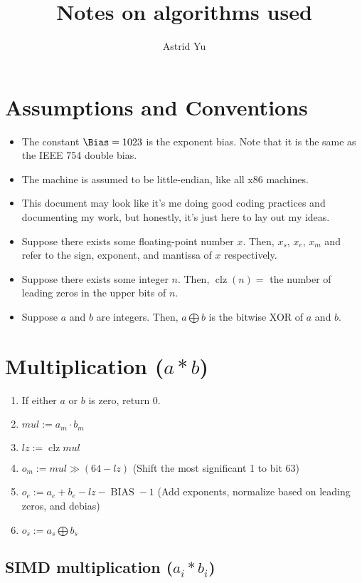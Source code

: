 \documentclass[12pt]{article}
\title{Notes on algorithms used}
\author{Astrid Yu}
\DeclareMathOperator{\bias}{BIAS}
\DeclareMathOperator{\clz}{clz}
\begin{document}
    \maketitle
    \section{Assumptions and Conventions}\label{sec:assumptions}

    \begin{itemize}
        \item The constant $\Bias = 1023$ is the exponent bias.
        Note that it is the same as the IEEE 754 double bias.
        \item The machine is assumed to be little-endian, like all x86 machines.
        \item This document may look like it's me doing good coding practices and documenting my work, but honestly, it's just here to lay out my ideas.
        \item Suppose there exists some floating-point number $x$.
        Then, $x_s$, $x_e$, $x_m$ and refer to the sign, exponent, and mantissa of $x$ respectively.
        \item Suppose there exists some integer $n$.
        Then, $\clz(n) =$ the number of leading zeros in the upper bits of $n$.
        \item Suppose $a$ and $b$ are integers.
        Then, $a \bigoplus b$ is the bitwise XOR of $a$ and $b$.
    \end{itemize}

    \section{Multiplication ($a * b$)}\label{sec:multiplication}
    \begin{enumerate}
        \item If either $a$ or $b$ is zero, return 0.
        \item $mul := a_m \cdot b_m$
        \item $lz := \clz mul$
        \item $o_m := mul \gg (64 - lz)$ (Shift the most significant 1 to bit 63)
        \item $o_e := a_e + b_e - lz - \bias - 1$ (Add exponents, normalize based on leading zeros, and debias)
        \item $o_s := a_s \bigoplus b_s$
    \end{enumerate}

    \subsection{SIMD multiplication ($a_i * b_i$)}\label{subsec:multiplication-simd}
\end{document}
